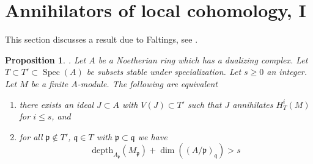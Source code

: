 \documentclass{stacks-project}
\newenvironment{reference}{\comment}{\endcomment}
\theoremstyle{plain}
\newtheorem{proposition}[subsection]{Proposition}
\theoremstyle{definition}
\theoremstyle{remark}
\numberwithin{equation}{subsection}
\def\Spec{\mathop{\mathrm{Spec}}}
\begin{document}
\section{Annihilators of local cohomology, I}
\label{section-annihilators}

\noindent
This section discusses a result due to Faltings, see
\cite{Faltings-annulators}.

\begin{proposition}
\label{proposition-annihilator}
\begin{reference}
\cite{Faltings-annulators}.
\end{reference}
Let $A$ be a Noetherian ring which has a dualizing complex.
Let $T \subset T' \subset \Spec(A)$ be subsets stable under
specialization. Let $s \geq 0$ an integer. Let $M$ be a finite $A$-module.
The following are equivalent
\begin{enumerate}
\item there exists an ideal $J \subset A$ with $V(J) \subset T'$
such that $J$ annihilates $H^i_T(M)$ for $i \leq s$, and
\item for all $\mathfrak p \not \in T'$,
$\mathfrak q \in T$ with $\mathfrak p \subset \mathfrak q$
we have
$$
\text{depth}_{A_\mathfrak p}(M_\mathfrak p) +
\dim((A/\mathfrak p)_\mathfrak q) > s
$$
\end{enumerate}
\end{proposition}
\end{document}
